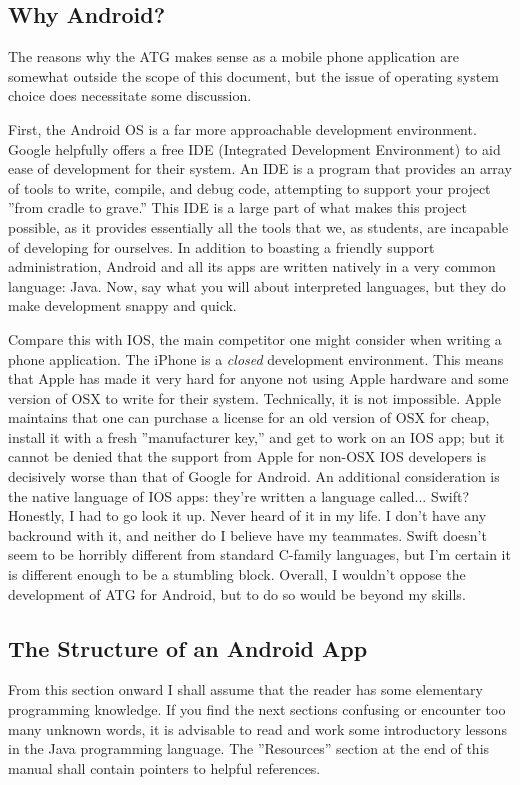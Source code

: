 \documentclass{report}
\begin{document}
\subsection{Why Android?}
The reasons why the ATG makes sense as a mobile phone application are somewhat outside the scope of this document, but the issue of
operating system choice does necessitate some discussion.\par
First, the Android OS is a far more approachable development environment. Google helpfully offers a free IDE (Integrated Development Environment) to aid ease of development for their system. An IDE is a program that provides an array of tools to write, compile, and debug code, 
attempting to support your project ''from cradle to grave.'' This IDE is a large part of what makes this project possible, as it provides
essentially all the tools that we, as students, are incapable of developing for ourselves. In addition to boasting a friendly support
administration, Android and all its apps are written natively in a very common language: Java. Now, say what you will about interpreted
languages, but they do make development snappy and quick.\par
Compare this with IOS, the main competitor one might consider when writing a phone application. The iPhone is a \emph{closed} development
environment. This means that Apple has made it very hard for anyone not using Apple hardware and some version of OSX to write for their system.
Technically, it is not impossible. Apple maintains that one can purchase a license for an old version of OSX for cheap, install it with a
fresh ''manufacturer key,'' and get to work on an IOS app; but it cannot be denied that the support from Apple for non-OSX IOS developers
is decisively worse than that of Google for Android. An additional consideration is the native language of IOS apps: they're written
a language called... Swift? Honestly, I had to go look it up. Never heard of it in my life. I don't have any backround with it, and neither
do I believe have my teammates. Swift doesn't seem to be horribly different from standard C-family languages, but I'm certain it is different
enough to be a stumbling block. Overall, I wouldn't oppose the development of ATG for Android, but to do so would be beyond my skills.

\subsection{The Structure of an Android App}
From this section onward I shall assume that the reader has some elementary programming knowledge. If you find the next sections confusing
or encounter too many unknown words, it is advisable to read and work some introductory lessons in the Java programming language.
The ''Resources'' section at the end of this manual shall contain pointers to helpful references.\cite{javaOracle}
\end{document}
